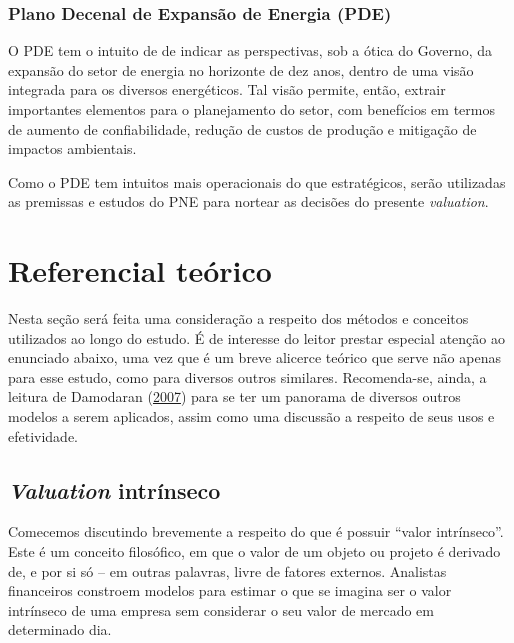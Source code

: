 \documentclass[grad,numbers]{coppe}
\begin{document}
  \hypertarget{plano-decenal-de-expansuxe3o-de-energia-pde}{%
  \subsection{Plano Decenal de Expansão de Energia (PDE)}\label{plano-decenal-de-expansuxe3o-de-energia-pde}}

  O PDE tem o intuito de de indicar as perspectivas, sob a ótica do Governo, da expansão do setor de energia no horizonte de dez anos, dentro de uma visão integrada para os diversos energéticos. Tal visão permite, então, extrair importantes elementos para o planejamento do setor, com benefícios em termos de aumento de confiabilidade, redução de custos de produção e mitigação de impactos ambientais.

  Como o PDE tem intuitos mais operacionais do que estratégicos, serão utilizadas as premissas e estudos do PNE para nortear as decisões do presente \emph{valuation}.

  \hypertarget{referencial-teuxf3rico}{%
  \chapter{Referencial teórico}\label{referencial-teuxf3rico}}

  Nesta seção será feita uma consideração a respeito dos métodos e conceitos utilizados ao longo do estudo. É de interesse do leitor prestar especial atenção ao enunciado abaixo, uma vez que é um breve alicerce teórico que serve não apenas para esse estudo, como para diversos outros similares. Recomenda-se, ainda, a leitura de Damodaran (\protect\hyperlink{ref-damodaran2007}{2007}) para se ter um panorama de diversos outros modelos a serem aplicados, assim como uma discussão a respeito de seus usos e efetividade.

  \hypertarget{valuation-intruxednseco}{%
  \section{\texorpdfstring{\emph{Valuation} intrínseco}{Valuation intrínseco}}\label{valuation-intruxednseco}}

  Comecemos discutindo brevemente a respeito do que é possuir ``valor intrínseco''. Este é um conceito filosófico, em que o valor de um objeto ou projeto é derivado de, e por si só -- em outras palavras, livre de fatores externos. Analistas financeiros constroem modelos para estimar o que se imagina ser o valor intrínseco de uma empresa sem considerar o seu valor de mercado em determinado dia.
\end{document}
